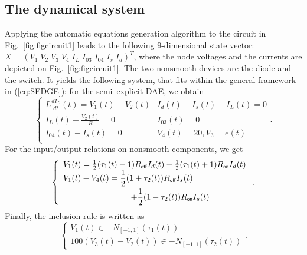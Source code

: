 \subsection{The dynamical system}
\label{section31}
 Applying the automatic equations generation algorithm to the circuit in Fig.~\ref{fig:figcircuit1} leads to the following $9$-dimensional state vector: $X=(V_1\;V_2\;V_3\;V_4\;I_L\;I_{03}\;I_{04}\;I_s\;I_d)^{T}$, where the node voltages and the currents are depicted on Fig.~\ref{fig:figcircuit1}.  The two nonsmooth devices are the diode and the switch. It yields the following system, that fits within the general framework in (\ref{eq:SEDGE}): for the semi--explicit DAE, we obtain
\begin{equation}
  \label{eq:72}
 \left\{ 
    \begin{array}{lll}
      L  \frac{dI_L}{dt}(t) = V_1(t)-V_2(t) &
      I_d(t)+I_s(t)-I_L(t)=0 \\
      I_L(t)-\frac{V_2(t)}{R}=0&
      I_{03}(t)=0\\
      I_{04}(t)-I_{s}(t)=0&
      V_4(t)=20 ,
      V_3=e(t)\\
\end{array}\right. .
\end{equation}
For the input/output relations on nonsmooth components, we get
\begin{equation}
 \left\{ \begin{array}{l}
V_{1}(t)=\frac{1}{2}(\tau_{1}(t)-1)R_\off I_{d}(t)-\frac{1}{2}(\tau_{1}(t)+1) R_\on I_{d}(t) \\ 
\begin{split}
 V_{1}(t)-V_{4}(t)= \frac{1}{2}(1+\tau_{2}(t)) R_\off I_{s}(t)
  \quad\quad \\+\frac{1}{2}(1-\tau_{2}(t)) R_\on I_{s}(t)
\end{split}
  \end{array} \right. .
\end{equation}
 Finally, the inclusion rule is written as
\begin{equation}
  \left\{\begin{array}{l}
      V_{1}(t) \in - N_{[-1,1]}(\tau_{1}(t)) \\   100(V_{3}(t)-V_{2}(t)) \in -N_{[-1,1]}(\tau_{2}(t))
    \end{array} 
\right. .
\end{equation}
